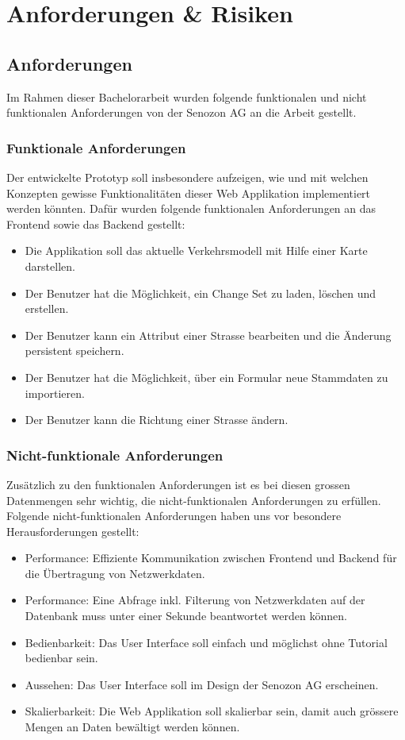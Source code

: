 \chapter{Anforderungen \& Risiken} \label{ch:anforderungen_section}
\section{Anforderungen}
Im Rahmen dieser Bachelorarbeit wurden folgende funktionalen und nicht funktionalen Anforderungen von der Senozon AG an die Arbeit gestellt.
\subsection{Funktionale Anforderungen}
Der entwickelte Prototyp soll insbesondere aufzeigen, wie und mit welchen Konzepten gewisse Funktionalitäten dieser Web Applikation implementiert werden könnten. Dafür wurden folgende funktionalen Anforderungen an das Frontend sowie das Backend gestellt:
\begin{itemize}
\itemsep0em
\item Die Applikation soll das aktuelle Verkehrsmodell mit Hilfe einer Karte darstellen.
\item Der Benutzer hat die Möglichkeit, ein Change Set zu laden, löschen und erstellen.
\item Der Benutzer kann ein Attribut einer Strasse bearbeiten und die Änderung persistent speichern.
\item Der Benutzer hat die Möglichkeit, über ein Formular neue Stammdaten zu importieren.
\item Der Benutzer kann die Richtung einer Strasse ändern.
\end{itemize}
\subsection{Nicht-funktionale Anforderungen}
\label{ch:NFRs}
Zusätzlich zu den funktionalen Anforderungen ist es bei diesen grossen Datenmengen sehr wichtig, die nicht-funktionalen Anforderungen zu erfüllen. Folgende nicht-funktionalen Anforderungen haben uns vor besondere Herausforderungen gestellt:
\begin{itemize}
\itemsep0em
\item Performance: Effiziente Kommunikation zwischen Frontend und Backend für die Übertragung von Netzwerkdaten.
\item Performance: Eine Abfrage inkl. Filterung von Netzwerkdaten auf der Datenbank muss unter einer Sekunde beantwortet werden können.
\item Bedienbarkeit: Das User Interface soll einfach und möglichst ohne Tutorial bedienbar sein.
\item Aussehen: Das User Interface soll im Design der Senozon AG erscheinen.
\item Skalierbarkeit: Die Web Applikation soll skalierbar sein, damit auch grössere Mengen an Daten bewältigt werden können.
\end{itemize}
